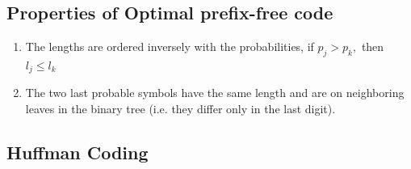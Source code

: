 \documentclass[24pt]{article}
\begin{document}
\subsection{Properties of Optimal prefix-free code}
\begin{enumerate}
\item The lengths are ordered inversely with the probabilities, if $p_j > p_k,$ then $\mathit{l}_j \le \mathit{l}_k$  
\item The two last probable symbols have the same length and are on neighboring leaves in the binary tree (i.e. they differ only in the last digit).
\end{enumerate}

\subsection{Huffman Coding}
\end{document}

